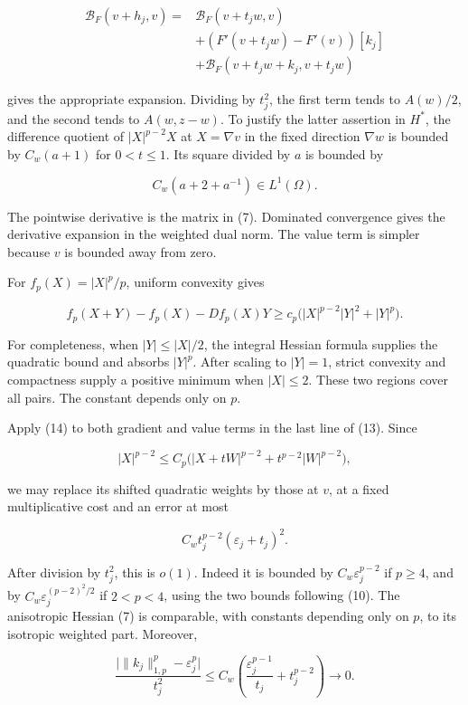 \documentclass[11pt]{article}
\begin{document}
\[
\begin{aligned}
\mathcal B_F(v+h_j,v)
={}&\mathcal B_F(v+t_jw,v)\\
&+(F'(v+t_jw)-F'(v))[k_j]\\
&+\mathcal B_F(v+t_jw+k_j,v+t_jw)
\end{aligned}
\tag{13}
\]

gives the appropriate expansion. Dividing by \(t_j^2\), the first term
tends to \(A(w)/2\), and the second tends to \(A(w,z-w)\). To justify
the latter assertion in \(H^*\), the difference quotient of
\(|X|^{p-2}X\) at \(X=\nabla v\) in the fixed direction \(\nabla w\) is
bounded by \(C_w(a+1)\) for \(0<t\le1\). Its square divided by \(a\) is
bounded by

\[
C_w(a+2+a^{-1})\in L^1(\Omega).
\]

The pointwise derivative is the matrix in (7). Dominated convergence
gives the derivative expansion in the weighted dual norm. The value term
is simpler because \(v\) is bounded away from zero.

For \(f_p(X)=|X|^p/p\), uniform convexity gives

\[
f_p(X+Y)-f_p(X)-Df_p(X)Y
\ge c_p\bigl(|X|^{p-2}|Y|^2+|Y|^p\bigr).
\tag{14}
\]

For completeness, when \(|Y|\le|X|/2\), the integral Hessian formula
supplies the quadratic bound and absorbs \(|Y|^p\). After scaling to
\(|Y|=1\), strict convexity and compactness supply a positive minimum
when \(|X|\le2\). These two regions cover all pairs. The constant
depends only on \(p\).

Apply (14) to both gradient and value terms in the last line of (13).
Since

\[
|X|^{p-2}\le C_p\bigl(|X+tW|^{p-2}+t^{p-2}|W|^{p-2}\bigr),
\]

we may replace its shifted quadratic weights by those at \(v\), at a
fixed multiplicative cost and an error at most

\[
C_wt_j^{p-2}(\varepsilon_j+t_j)^2.
\]

After division by \(t_j^2\), this is \(o(1)\). Indeed it is bounded by
\(C_w\varepsilon_j^{p-2}\) if \(p\ge4\), and by
\(C_w\varepsilon_j^{(p-2)^2/2}\) if \(2<p<4\), using the two bounds
following (10). The anisotropic Hessian (7) is comparable, with
constants depending only on \(p\), to its isotropic weighted part.
Moreover,

\[
\frac{\bigl|\|k_j\|_{1,p}^p-\varepsilon_j^p\bigr|}{t_j^2}
\le C_w\left(\frac{\varepsilon_j^{p-1}}{t_j}+t_j^{p-2}\right)\longrightarrow0.
\tag{15}
\]
\end{document}
